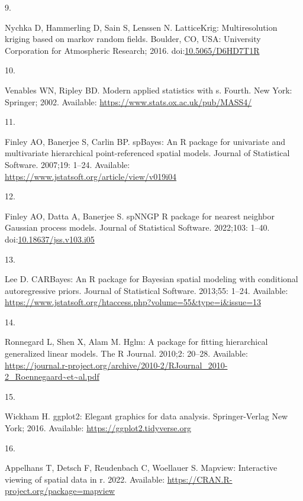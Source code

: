 \documentclass[10pt,letterpaper]{article}
\newlength{\cslhangindent}
\newlength{\csllabelwidth}
\newlength{\cslentryspacingunit} %
\newenvironment{CSLReferences}[2] %
 {%
  \setlength{\parindent}{0pt}
  \ifodd #1
  \let\oldpar\par
  \def\par{\hangindent=\cslhangindent\oldpar}
  \fi
  \setlength{\parskip}{#2\cslentryspacingunit}
 }%
 {}
\newcommand{\CSLLeftMargin}[1]{\parbox[t]{\csllabelwidth}{#1}}
\newcommand{\CSLRightInline}[1]{\parbox[t]{\linewidth - \csllabelwidth}{#1}\break}
\begin{document}
\begin{CSLReferences}{0}{0}
\leavevmode\hypertarget{ref-nychka2016latticekrig}{}%
\CSLLeftMargin{9. }
\CSLRightInline{Nychka D, Hammerling D, Sain S, Lenssen N. LatticeKrig:
Multiresolution kriging based on markov random fields. Boulder, CO, USA:
University Corporation for Atmospheric Research; 2016.
doi:\href{https://doi.org/10.5065/D6HD7T1R}{10.5065/D6HD7T1R}}

\leavevmode\hypertarget{ref-venables2002S}{}%
\CSLLeftMargin{10. }
\CSLRightInline{Venables WN, Ripley BD. Modern applied statistics with
s. Fourth. New York: Springer; 2002. Available:
\url{https://www.stats.ox.ac.uk/pub/MASS4/}}

\leavevmode\hypertarget{ref-finley2007spbayes}{}%
\CSLLeftMargin{11. }
\CSLRightInline{Finley AO, Banerjee S, Carlin BP. {spBayes}: An {R}
package for univariate and multivariate hierarchical point-referenced
spatial models. Journal of Statistical Software. 2007;19: 1--24.
Available: \url{https://www.jstatsoft.org/article/view/v019i04}}

\leavevmode\hypertarget{ref-finley2002spnngp}{}%
\CSLLeftMargin{12. }
\CSLRightInline{Finley AO, Datta A, Banerjee S. {spNNGP} {R} package for
nearest neighbor {G}aussian process models. Journal of Statistical
Software. 2022;103: 1--40.
doi:\href{https://doi.org/10.18637/jss.v103.i05}{10.18637/jss.v103.i05}}

\leavevmode\hypertarget{ref-lee2013carbayes}{}%
\CSLLeftMargin{13. }
\CSLRightInline{Lee D. {CARBayes}: An {R} package for {B}ayesian spatial
modeling with conditional autoregressive priors. Journal of Statistical
Software. 2013;55: 1--24. Available:
\url{https://www.jstatsoft.org/htaccess.php?volume=55\&type=i\&issue=13}}

\leavevmode\hypertarget{ref-ronnegard2010hglm}{}%
\CSLLeftMargin{14. }
\CSLRightInline{Ronnegard L, Shen X, Alam M. Hglm: A package for fitting
hierarchical generalized linear models. The R Journal. 2010;2: 20--28.
Available:
\url{https://journal.r-project.org/archive/2010-2/RJournal_2010-2_Roennegaard~et~al.pdf}}

\leavevmode\hypertarget{ref-wickham2016ggplot2}{}%
\CSLLeftMargin{15. }
\CSLRightInline{Wickham H. ggplot2: Elegant graphics for data analysis.
Springer-Verlag New York; 2016. Available:
\url{https://ggplot2.tidyverse.org}}

\leavevmode\hypertarget{ref-appelhans2022mapview}{}%
\CSLLeftMargin{16. }
\CSLRightInline{Appelhans T, Detsch F, Reudenbach C, Woellauer S.
Mapview: Interactive viewing of spatial data in r. 2022. Available:
\url{https://CRAN.R-project.org/package=mapview}}


\end{CSLReferences}
\end{document}
